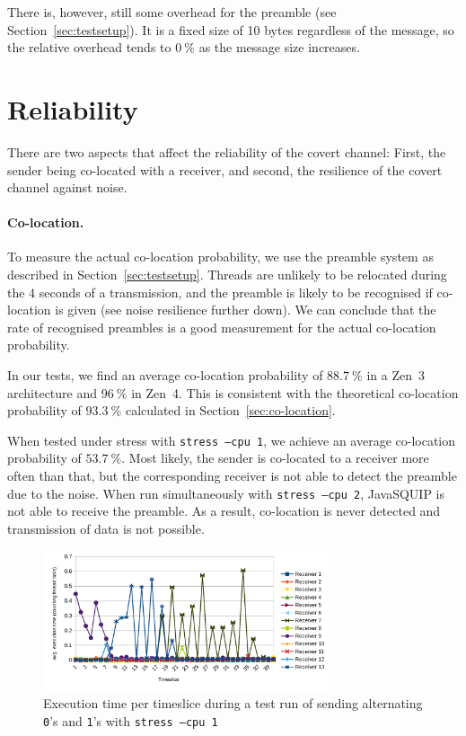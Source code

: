 \documentclass[11pt,
  titlepage=false,
  parskip=half,      %
]{scrreprt}
\begin{document}
There is, however, still some overhead for the preamble (see Section~\ref{sec:testsetup}).
It is a fixed size of 10 bytes regardless of the message,
so the relative overhead tends to $0~\%$ as the message size increases.

\section{Reliability}
There are two aspects that affect the reliability of the covert channel:
First, the sender being co-located with a receiver, and second, the resilience of the covert channel against noise.

\paragraph{Co-location.}
To measure the actual co-location probability, we use the preamble system as described in Section~\ref{sec:testsetup}.
Threads are unlikely to be relocated during the 4 seconds of a transmission,
and the preamble is likely to be recognised if co-location is given (see noise resilience further down).
We can conclude that the rate of recognised preambles is a good measurement for the actual co-location probability.

In our tests, we find an average co-location probability of $88.7~\%$ in a Zen~3 architecture and $96~\%$ in Zen~4.
This is consistent with the theoretical co-location probability of $93.3~\%$ calculated in Section~\ref{sec:co-location}.

When tested under stress with \texttt{stress --cpu 1}, we achieve an average co-location probability of $53.7~\%$.
Most likely, the sender is co-located to a receiver more often than that,
but the corresponding receiver is not able to detect the preamble due to the noise.
When run simultaneously with \texttt{stress --cpu 2}, JavaSQUIP is not able to receive the preamble.
As a result, co-location is never detected and transmission of data is not possible.

\begin{figure}
    \centering
    \includegraphics[width=0.75\textwidth]{figures/contentiontest_stress}

    \caption{Execution time per timeslice during a test run of sending alternating \texttt{0}'s and \texttt{1}'s with \texttt{stress --cpu 1}}
    \label{fig:contentiontest_stress}
\end{figure}
\end{document}
